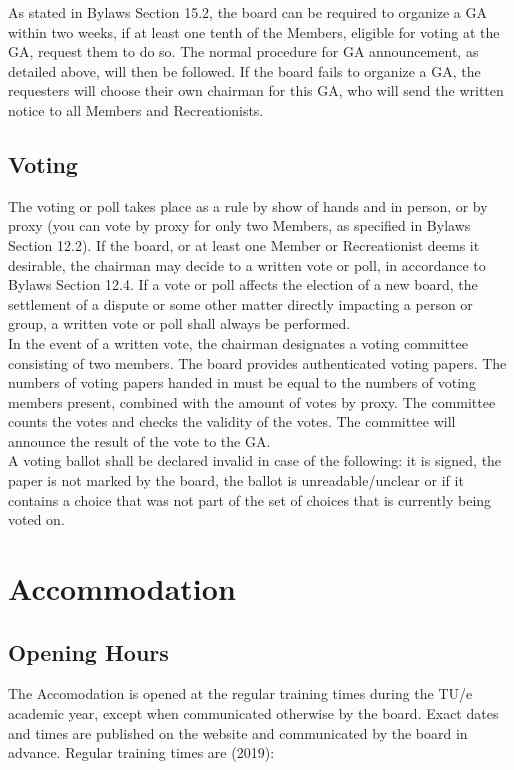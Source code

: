 \documentclass[a4paper]{article}
\newcommand{\Asta}{Bylaws} %
\begin{document}
As stated in { \Asta} Section 15.2, the board can be required to organize a { GA} within two weeks, if at least one tenth of the { Members}, eligible for voting at the { GA}, request them to do so. The normal procedure for { GA} announcement, as detailed above, will then be followed. If the board fails to organize a { GA}, the requesters will choose their own chairman for this { GA}, who will send the written notice to all { Members} and { Recreationists}. \\

\subsection{Voting}
The voting or poll takes place as a rule by show of hands and in person, or by proxy (you can vote by proxy for only two { Members}, as specified in { \Asta} Section 12.2). If the board, or at least one { Member} or { Recreationist} deems it desirable, the chairman may decide to a written vote or poll, in accordance to { \Asta} Section 12.4. If a vote or poll affects the election of a new board, the settlement of a dispute or some other matter directly impacting a person or group, a written vote or poll shall always be performed. \\ 

In the event of a written vote, the chairman designates a voting committee consisting of two members. The board provides authenticated voting papers. The numbers of voting papers handed in must be equal to the numbers of voting members present, combined with the amount of votes by proxy. The committee counts the votes and checks the validity of the votes. The committee will announce the result of the vote to the { GA}. \\

A voting ballot shall be declared invalid in case of the following: it is signed, the paper is not marked by the board, the ballot is unreadable/unclear or if it contains a choice that was not part of the set of choices that is currently being voted on.

\section{Accommodation}
\subsection{Opening Hours}
\label{section:opening}
The { Accomodation} is opened at the regular training times during the { TU/e} academic year, except when communicated otherwise by the board. Exact dates and times are published on the website and communicated by the board in advance. Regular training times are {\g (2019)}: \\
\end{document}
